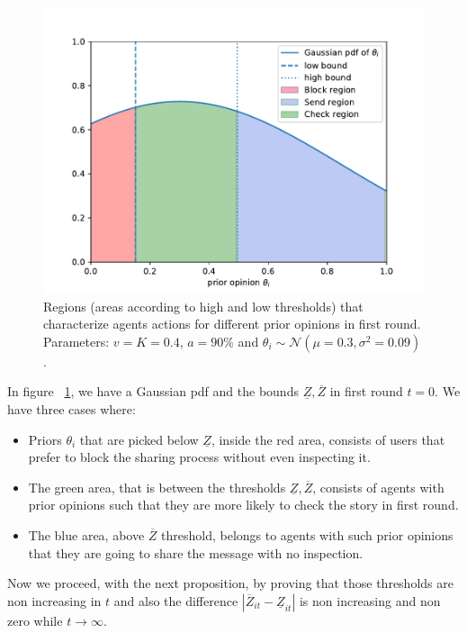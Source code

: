 \begin{figure}[t]
	\centering
	\includegraphics[width=.75\textwidth]{Figures/Zbounds.pdf}
	
	\caption{Regions (areas according to high and low thresholds) that characterize agents actions for different prior opinions in first round. Parameters: $v=K=0.4$, $a=90\%$ and $\theta_i \sim \mathcal{N} (\mu=0.3,\sigma^2=0.09)$.}
	
	\label{fig:boundsandAreas}
\end{figure}

In figure ~\ref{fig:boundsandAreas}, we have a Gaussian pdf and the bounds $\underline{Z}, \overline{Z}$ in first round $t=0$. We have three cases where:

\begin{itemize}
	\item Priors $\theta_i$ that are picked below $\underline{Z}$, inside the red area, consists of users that prefer to block the sharing process without even inspecting it.
	\item The green area, that is between the thresholds $\underline{Z}, \overline{Z}$, consists of agents with prior opinions such that they are more likely to check the story in first round.
	\item The blue area, above $\overline{Z}$ threshold, belongs to agents with such prior opinions that they are going to share the message with no inspection.
\end{itemize}

Now we proceed, with the next proposition, by proving that those thresholds are non increasing in $t$ and also the difference $|\overline{Z}_{it} - \underline{Z}_{it}|$ is non increasing and non zero while $t \rightarrow \infty$.

